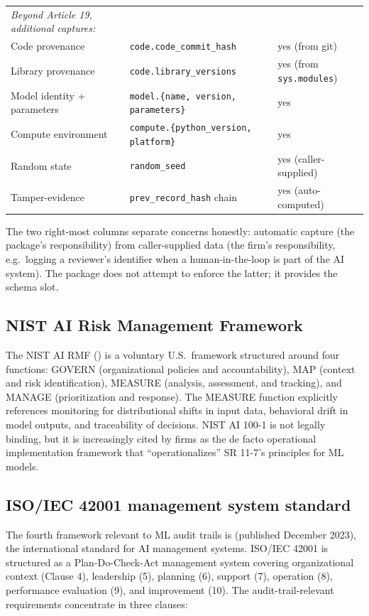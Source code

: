 \begin{table}[H]
\begin{tabular}{@{}p{5.0cm}p{6.5cm}p{3.4cm}@{}}
\midrule
\textit{Beyond Article 19, additional captures:} & & \\
Code provenance & \texttt{code.code\_commit\_hash} & yes (from git) \\
Library provenance & \texttt{code.library\_versions} & yes (from \texttt{sys.modules}) \\
Model identity + parameters & \texttt{model.\{name, version, parameters\}} & yes \\
Compute environment & \texttt{compute.\{python\_version, platform\}} & yes \\
Random state & \texttt{random\_seed} & yes (caller-supplied) \\
Tamper-evidence & \texttt{prev\_record\_hash} chain & yes (auto-computed) \\
\bottomrule
\end{tabular}
\end{table}

The two right-most columns separate concerns honestly: automatic capture (the package's responsibility) from caller-supplied data (the firm's responsibility, e.g.\ logging a reviewer's identifier when a human-in-the-loop is part of the AI system). The package does not attempt to enforce the latter; it provides the schema slot.

\subsection{NIST AI Risk Management Framework}\label{sec:nist}

The NIST AI RMF (\citealp{NIST_AI_100_1}) is a voluntary U.S.\ framework structured around four functions: GOVERN (organizational policies and accountability), MAP (context and risk identification), MEASURE (analysis, assessment, and tracking), and MANAGE (prioritization and response). The MEASURE function explicitly references monitoring for distributional shifts in input data, behavioral drift in model outputs, and traceability of decisions. NIST AI 100-1 is not legally binding, but it is increasingly cited by firms as the de facto operational implementation framework that ``operationalizes'' SR 11-7's principles for ML models.

\subsection{ISO/IEC 42001 management system standard}\label{sec:iso42001}

The fourth framework relevant to ML audit trails is \citet{ISO42001} (published December 2023), the international standard for AI management systems. ISO/IEC 42001 is structured as a Plan-Do-Check-Act management system covering organizational context (Clause 4), leadership (5), planning (6), support (7), operation (8), performance evaluation (9), and improvement (10). The audit-trail-relevant requirements concentrate in three clauses:

